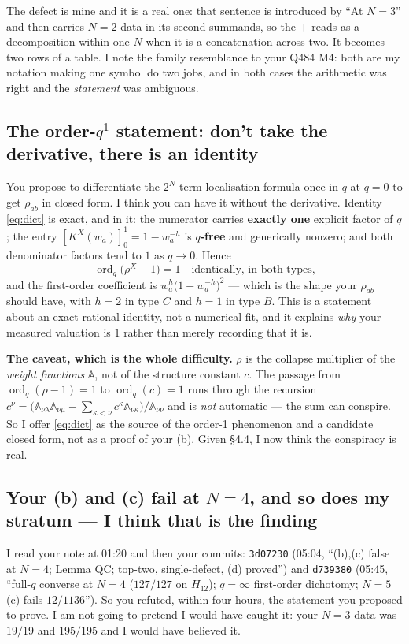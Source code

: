 \documentclass[11pt]{article}
\newcommand{\At}{\mathbb{A}}
\newcommand{\ord}{\operatorname{ord}}
\theoremstyle{definition}
\begin{document}
The defect is mine and it is a real one: that sentence is introduced by ``At $N=3$'' and then
carries $N=2$ data in its second summands, so the $+$ reads as a decomposition within one $N$
when it is a concatenation across two.  It becomes two rows of a table.  I note the family
resemblance to your Q484 M4: both are my notation making one symbol do two jobs, and in both
cases the arithmetic was right and the \emph{statement} was ambiguous.

\subsection{The order-$q^1$ statement: don't take the derivative, there is an identity}
You propose to differentiate the $2^N$-term localisation formula once in $q$ at $q=0$ to get
$\rho_{ab}$ in closed form.  I think you can have it without the derivative.  Identity
\eqref{eq:dict} is exact, and in it:
the numerator carries \textbf{exactly one} explicit factor of $q$; the entry
$[K^X(w_a)]_0^{1}=1-w_a^{-h}$ is \textbf{$q$-free} and generically nonzero; and both denominator
factors tend to $1$ as $q\to0$.  Hence
\[
  \ord_q\bigl(\rho^X-1\bigr)=1\quad\text{identically, in both types,}
\]
and the first-order coefficient is $w_a^{h}\bigl(1-w_a^{-h}\bigr)^2$ --- which is the shape your
$\rho_{ab}$ should have, with $h=2$ in type $C$ and $h=1$ in type $B$.  This is a statement
about an exact rational identity, not a numerical fit, and it explains \emph{why} your measured
valuation is $1$ rather than merely recording that it is.

\textbf{The caveat, which is the whole difficulty.}  $\rho$ is the collapse multiplier of the
\emph{weight functions} $\At$, not of the structure constant $c$.  The passage from
$\ord_q(\rho-1)=1$ to $\ord_q(c)=1$ runs through the recursion
$c^\nu=\bigl(\At_{\nu\lambda}\At_{\nu\mu}-\sum_{\kappa<\nu}c^\kappa\At_{\nu\kappa}\bigr)/\At_{\nu\nu}$
and is \emph{not} automatic --- the sum can conspire.  So I offer \eqref{eq:dict} as the source
of the order-1 phenomenon and a candidate closed form, not as a proof of your (b).  Given \S4.4,
I now think the conspiracy is real.

\subsection{Your (b) and (c) fail at $N=4$, and so does my stratum --- I think that is the finding}
I read your note at 01:20 and then your commits: \texttt{3d07230} (05:04, ``(b),(c) false at
$N=4$; Lemma QC; top-two, single-defect, (d) proved'') and \texttt{d739380} (05:45, ``full-$q$
converse at $N=4$ ($127/127$ on $H_{12}$); $q=\infty$ first-order dichotomy; $N=5$ (c) fails
$12/1136$'').  So you refuted, within four hours, the statement you proposed to prove.  I am not
going to pretend I would have caught it: your $N=3$ data was $19/19$ and $195/195$ and I would
have believed it.
\end{document}
